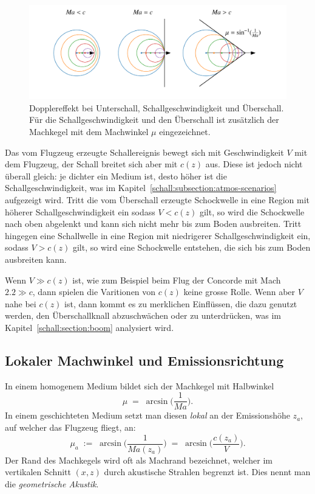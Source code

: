 \begin{figure}
    \centering
    \includegraphics[width=\textwidth]{papers/schall/figures/mach_doppler_triptych_offsets.pdf}
    \caption{Dopplereffekt bei Unterschall, Schallgeschwindigkeit und Überschall.
    Für die Schallgeschwindigkeit und den Überschall ist zusätzlich der
    Machkegel mit dem Machwinkel $\mu$ eingezeichnet.}
    \label{fig:schall:mach-zones}
\end{figure}
Das vom Flugzeug erzeugte Schallereignis bewegt sich mit Geschwindigkeit $V$
mit dem Flugzeug, der Schall breitet sich aber mit $c(z)$ aus.
Diese ist jedoch nicht überall gleich: je dichter ein Medium ist, desto
höher ist die Schallgeschwindigkeit, was im
Kapitel~\ref{schall:subsection:atmos-scenarios} aufgezeigt wird.
Tritt die vom Überschall erzeugte Schockwelle in eine Region mit höherer
Schallgeschwindigkeit ein sodass $V<c(z)$ gilt, so wird die Schockwelle
nach oben abgelenkt und kann sich nicht mehr bis zum Boden ausbreiten.
Tritt hingegen eine Schallwelle in eine Region mit niedrigerer
Schallgeschwindigkeit ein, sodass $V>c(z)$ gilt, so wird eine Schockwelle
entstehen, die sich bis zum Boden ausbreiten kann.

Wenn $V \gg c(z)$ ist, wie zum Beispiel beim Flug der Concorde mit Mach
$2.2 \gg c$, dann spielen die Varitionen von $c(z)$ keine grosse Rolle.
Wenn aber $V$ nahe bei $c(z)$ ist, dann kommt es zu merklichen Einflüssen,
die dazu genutzt werden, den Überschallknall abzuschwächen oder zu
unterdrücken, was im Kapitel~\ref{schall:section:boom} analysiert wird.

\subsection{Lokaler Machwinkel und Emissionsrichtung}
In einem homogenem Medium bildet sich der Machkegel mit Halbwinkel
\begin{equation}
    \mu \;=\; \arcsin\!\Bigg(\frac{1}{\textit{Ma}}\Bigg).
\end{equation}
In einem geschichteten Medium setzt man diesen \emph{lokal} an der
Emissionshöhe $z_a$, auf welcher das Flugzeug fliegt, an:
\begin{equation}
    \mu_a \;:=\; \arcsin\!\Bigg(\frac{1}{\textit{Ma}(z_a)}\Bigg)
    \;=\; \arcsin\!\Bigg(\frac{c(z_a)}{V}\Bigg) .
    \label{eq:local-mach-angle}
\end{equation}
Der Rand des Machkegels wird oft als Machrand bezeichnet, welcher im
vertikalen Schnitt $(x,z)$ durch akustische Strahlen begrenzt ist.
Dies nennt man die \emph{geometrische Akustik}.

